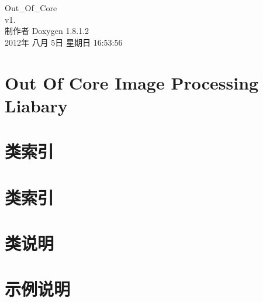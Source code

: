 \documentclass{book}
\begin{document}
\begin{titlepage}
\vspace*{7cm}
\begin{center}
{\Large Out\-\_\-\-Of\-\_\-\-Core \\[1ex]\large v1. }\\
\vspace*{1cm}
{\large 制作者 Doxygen 1.8.1.2}\\
\vspace*{0.5cm}
{\small 2012年 八月 5日 星期日 16:53:56}\\
\end{center}
\end{titlepage}
\clearemptydoublepage
{}
\tableofcontents
\clearemptydoublepage
{}
\chapter{Out Of Core Image Processing Liabary}
\label{index}
\chapter{类索引}

\chapter{类索引}

\chapter{类说明}















\chapter{示例说明}





\printindex
\end{document}
